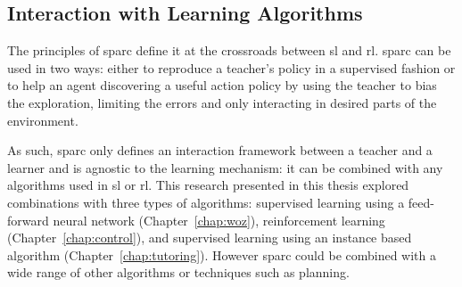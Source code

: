 

\subsection{Interaction with Learning Algorithms}

The principles of \gls{sparc} define it at the crossroads between \gls{sl} and \gls{rl}. \gls{sparc} can be used in two ways: either to reproduce a teacher's policy in a supervised fashion or to help an agent discovering a useful action policy by using the teacher to bias the exploration, limiting the errors and only interacting in desired parts of the environment.

As such, \gls{sparc} only defines an interaction framework between a teacher and a learner and is agnostic to the learning mechanism: it can be combined with any algorithms used in \gls{sl} or \gls{rl}. This research presented in this thesis explored combinations with three types of algorithms: supervised learning using a feed-forward neural network (Chapter~\ref{chap:woz}), reinforcement learning (Chapter~\ref{chap:control}), and supervised learning using an instance based algorithm (Chapter~\ref{chap:tutoring}). However \gls{sparc} could be combined with a wide range of other algorithms or techniques such as planning.


